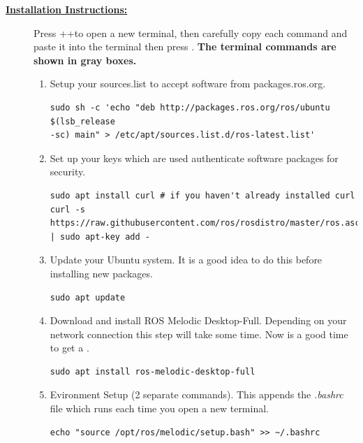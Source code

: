 \documentclass[12pt]{article}
\begin{document}
\begin{description}
\item[\textbf{\underline{Installation Instructions:}}] \hfill \vspace{0mm}

Press \CTRLKey+\ALTKey+\TKey to open a new terminal, then carefully copy each command and paste it into the terminal then press \ENTERKey. { \bf The terminal commands are shown in gray boxes.}


\begin{enumerate}
	
	
	\item  Setup your sources.list to accept software from packages.ros.org.

	\begin{verbatim}
sudo sh -c 'echo "deb http://packages.ros.org/ros/ubuntu $(lsb_release 
-sc) main" > /etc/apt/sources.list.d/ros-latest.list'
	\end{verbatim}
	
	\item Set up your keys which are used authenticate software packages for security.
	
	\begin{verbatim}
sudo apt install curl # if you haven't already installed curl
curl -s https://raw.githubusercontent.com/ros/rosdistro/master/ros.asc 
| sudo apt-key add -
	\end{verbatim}
	
				
	\item Update your Ubuntu system. It is a good idea to do this before installing new packages. 
	
	\begin{verbatim}
sudo apt update
	\end{verbatim}

\newpage
	
	\item Download and install ROS Melodic Desktop-Full. Depending on your network connection this step will take some time. Now is a good time to get a \Coffeecup \Cooley.  
	
	\begin{verbatim}
sudo apt install ros-melodic-desktop-full
	\end{verbatim}

\item Evironment Setup (2 separate commands). This appends the {\it .bashrc} file which runs each time you open a new terminal. 
\begin{verbatim} 
echo "source /opt/ros/melodic/setup.bash" >> ~/.bashrc
\end{verbatim}


\end{enumerate}
\end{description}
\end{document}
